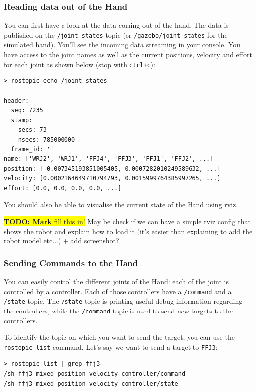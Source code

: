 \documentclass[12pt]{article}
\newcommand{\todo}[1]{\colorbox{yellow}{\textbf{TODO: #1} fill this in!}}
\begin{document}
\subsubsection{Reading data out of the Hand}
\par You can first have a look at the data coming out of the hand. The data is published on the \texttt{/joint\_states} topic (or \texttt{/gazebo/joint\_states} for the simulated hand). You'll see the incoming data streaming in your console. You have access to the joint names as well as the current positions, velocity and effort for each joint as shown below (stop with \texttt{ctrl+c}):
  \begin{lstlisting}[escapeinside='']
> rostopic echo /joint_states
---
header:
  seq: 7235
  stamp:
    secs: 73
    nsecs: 785000000
  frame_id: ''
name: ['WRJ2', 'WRJ1', 'FFJ4', 'FFJ3', 'FFJ1', 'FFJ2', ...]
position: [-0.007345193851005405, 0.0007282010249589632, ...]
velocity: [0.0002164649710794793, 0.0015999764385997265, ...]
effort: [0.0, 0.0, 0.0, 0.0, ...]
  \end{lstlisting}

\par You should also be able to visualise the current state of the Hand using \href{ros.org/wiki/rviz}{rviz}.

\todo{Mark} May be check if we can have a simple rviz config that shows the robot and explain how to load it (it's easier than explaining to add the robot model etc...) + add screenshot?

\subsubsection{Sending Commands to the Hand}
\par You can easily control the different joints of the Hand: each of the joint is controlled by a controller. Each of those controllers have a \texttt{/command} and a \texttt{/state} topic. The \texttt{/state} topic is printing useful debug information regarding the controllers, while the \texttt{/command} topic is used to send new targets to the controllers.

\par To identify the topic on which you want to send the target, you can use the \texttt{rostopic list} command. Let's say we want to send a target to \texttt{FFJ3}:
  \begin{lstlisting}[escapeinside='']
> rostopic list | grep ffj3
/sh_ffj3_mixed_position_velocity_controller/command
/sh_ffj3_mixed_position_velocity_controller/state
  \end{lstlisting}
\end{document}
